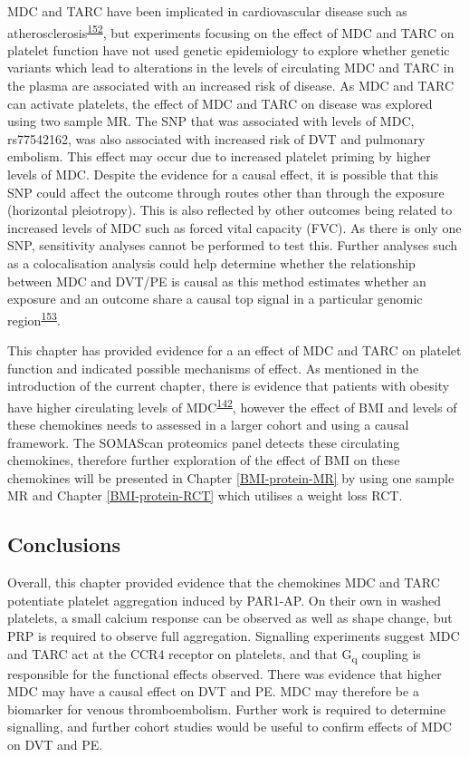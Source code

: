 \documentclass[11pt,twoside]{bristolthesis}
\begin{document}
MDC and TARC have been implicated in cardiovascular disease such as atherosclerosis\textsuperscript{\protect\hyperlink{ref-Weber2004}{152}}, but experiments focusing on the effect of MDC and TARC on platelet function have not used genetic epidemiology to explore whether genetic variants which lead to alterations in the levels of circulating MDC and TARC in the plasma are associated with an increased risk of disease. As MDC and TARC can activate platelets, the effect of MDC and TARC on disease was explored using two sample MR. The SNP that was associated with levels of MDC, rs77542162, was also associated with increased risk of DVT and pulmonary embolism. This effect may occur due to increased platelet priming by higher levels of MDC. Despite the evidence for a causal effect, it is possible that this SNP could affect the outcome through routes other than through the exposure (horizontal pleiotropy). This is also reflected by other outcomes being related to increased levels of MDC such as forced vital capacity (FVC). As there is only one SNP, sensitivity analyses cannot be performed to test this. Further analyses such as a colocalisation analysis could help determine whether the relationship between MDC and DVT/PE is causal as this method estimates whether an exposure and an outcome share a causal top signal in a particular genomic region\textsuperscript{\protect\hyperlink{ref-Giambartolomei2014}{153}}.

This chapter has provided evidence for a an effect of MDC and TARC on platelet function and indicated possible mechanisms of effect. As mentioned in the introduction of the current chapter, there is evidence that patients with obesity have higher circulating levels of MDC\textsuperscript{\protect\hyperlink{ref-Safa2016}{142}}, however the effect of BMI and levels of these chemokines needs to assessed in a larger cohort and using a causal framework. The SOMAScan proteomics panel detects these circulating chemokines, therefore further exploration of the effect of BMI on these chemokines will be presented in Chapter \ref{BMI-protein-MR} by using one sample MR and Chapter \ref{BMI-protein-RCT} which utilises a weight loss RCT.

\hypertarget{conclusions}{%
\subsection{Conclusions}\label{conclusions}}

Overall, this chapter provided evidence that the chemokines MDC and TARC potentiate platelet aggregation induced by PAR1-AP. On their own in washed platelets, a small calcium response can be observed as well as shape change, but PRP is required to observe full aggregation. Signalling experiments suggest MDC and TARC act at the CCR4 receptor on platelets, and that G\textsubscript{q} coupling is responsible for the functional effects observed. There was evidence that higher MDC may have a causal effect on DVT and PE. MDC may therefore be a biomarker for venous thromboembolism. Further work is required to determine signalling, and further cohort studies would be useful to confirm effects of MDC on DVT and PE.
\end{document}
